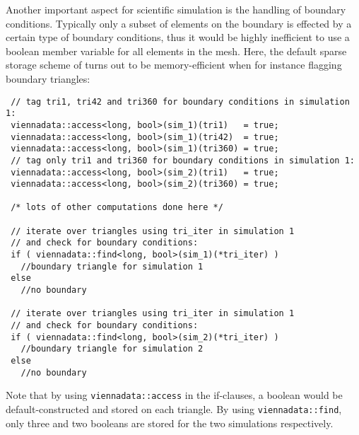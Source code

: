 Another important aspect for scientific simulation is the handling of boundary conditions. Typically only a subset of elements on the boundary is effected by a certain type of boundary conditions, thus it would be highly inefficient to use a boolean member variable for all elements in the mesh. Here, the default sparse storage scheme of {\ViennaData} turns out to be memory-efficient when for instance flagging boundary triangles:
\begin{lstlisting}
 // tag tri1, tri42 and tri360 for boundary conditions in simulation 1:
 viennadata::access<long, bool>(sim_1)(tri1)   = true; 
 viennadata::access<long, bool>(sim_1)(tri42)  = true; 
 viennadata::access<long, bool>(sim_1)(tri360) = true; 
 // tag only tri1 and tri360 for boundary conditions in simulation 1:
 viennadata::access<long, bool>(sim_2)(tri1)   = true; 
 viennadata::access<long, bool>(sim_2)(tri360) = true; 

 /* lots of other computations done here */

 // iterate over triangles using tri_iter in simulation 1
 // and check for boundary conditions:
 if ( viennadata::find<long, bool>(sim_1)(*tri_iter) )
   //boundary triangle for simulation 1
 else
   //no boundary

 // iterate over triangles using tri_iter in simulation 1
 // and check for boundary conditions:
 if ( viennadata::find<long, bool>(sim_2)(*tri_iter) )
   //boundary triangle for simulation 2
 else
   //no boundary
\end{lstlisting}
Note that by using \lstinline|viennadata::access| in the if-clauses, a boolean would be default-constructed and stored on each triangle. By using \lstinline|viennadata::find|, only three and two booleans are stored for the two simulations respectively.

